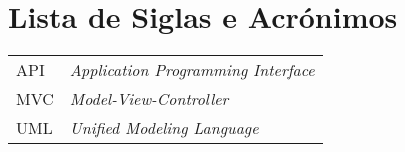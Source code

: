 
\section*{Lista de Siglas e Acrónimos}

{\renewcommand{\arraystretch}{1}
\begin{tabular}{ @{} l @{\hskip 18pt} l }
  API & \emph{Application Programming Interface} \\
  MVC & \emph{Model-View-Controller} \\
  UML & \emph{Unified Modeling Language} \\
\end{tabular}}

